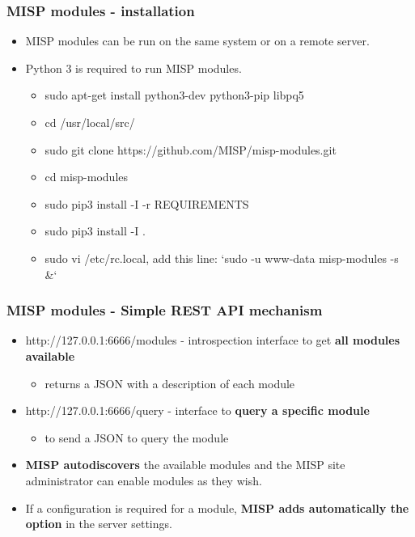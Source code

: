 \begin{frame}[fragile]
        \frametitle{MISP modules - installation}
        \begin{itemize}
        \item MISP modules can be run on the same system or on a remote server.
        \item Python 3 is required to run MISP modules.
            \begin{itemize}
                \item sudo apt-get install python3-dev python3-pip libpq5
                \item cd /usr/local/src/
                \item sudo git clone https://github.com/MISP/misp-modules.git
                \item cd misp-modules
                \item sudo pip3 install -I -r REQUIREMENTS
                \item sudo pip3 install -I .
                \item sudo vi /etc/rc.local, add this line: `sudo -u www-data misp-modules -s \&`
            \end{itemize}
        \end{itemize}

\end{frame}

\begin{frame}
        \frametitle{MISP modules - Simple REST API mechanism}
        \begin{itemize}
                \item http://127.0.0.1:6666/modules - introspection interface to get {\bf all modules available}
                        \begin{itemize}
                                \item returns a JSON with a description of each module
                        \end{itemize}
                \item http://127.0.0.1:6666/query - interface to {\bf query a specific module}
                        \begin{itemize}
                                \item to send a JSON to query the module
                        \end{itemize}
                \item {\bf MISP autodiscovers} the available modules and the MISP site administrator can enable modules as they wish.
                \item If a configuration is required for a module, {\bf MISP adds automatically the option} in the server settings.
        \end{itemize}
\end{frame}

